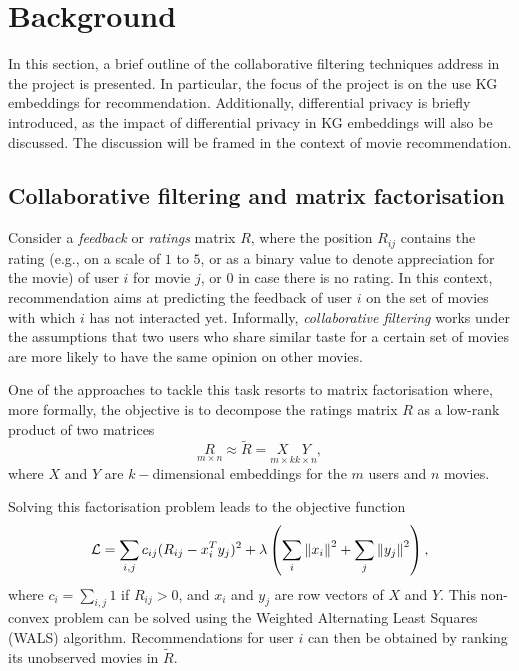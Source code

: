 \section{Background}\label{sec:background}

In this section, a brief outline of the collaborative filtering techniques address in the project is presented.
In particular, the focus of the project is on the use KG embeddings for recommendation.
Additionally, differential privacy \parencite{dwork2008differential} is briefly introduced, as the impact of differential privacy in KG embeddings will also be discussed.
The discussion will be framed in the context of movie recommendation.

\subsection{Collaborative filtering and matrix factorisation}\label{sec:factorisation}

Consider a \emph{feedback} or \emph{ratings} matrix $R$, where the position $R_{ij}$ contains the rating (e.g., on a scale of $1$ to $5$, or as a binary value to denote appreciation for the movie) of user $i$ for movie $j$, or $0$ in case there is no rating.
In this context, recommendation aims at predicting the feedback of user $i$ on the set of movies with which $i$ has not interacted yet. 
Informally, \emph{collaborative filtering} works under the assumptions that two users who share similar taste for a certain set of movies are more likely to have the same opinion on other movies.

One of the approaches to tackle this task resorts to matrix factorisation where, more formally, the objective is to decompose the ratings matrix $R$ as a low-rank product of two matrices
$$ \underset{\scriptscriptstyle{m \times n}}{R} \approx \widetilde{R} = \underset{\scriptscriptstyle{m\times k}}{X}\underset{\scriptscriptstyle{k\times n}}{Y},$$
where $X$ and $Y$ are $k-$dimensional embeddings for the $m$ users and $n$ movies.

Solving this factorisation problem leads to the objective function
\begin{equation}\label{eq:wals}
  \mathcal{L} = \sum_{i, j} c_{ij} (R_{ij} - {x_i^T y_j})^2 + \lambda \left( \sum_i \left\lVert{x_i}\right\rVert^2 + \sum_j \left\lVert{y_j}\right\rVert^2 \right),
\end{equation}
where $c_i = \sum_{i, j}1$ if $R_{ij}>0$, and $x_i$ and $y_j$ are row vectors of $X$ and $Y$.
This non-convex problem can be solved using the Weighted Alternating Least Squares (WALS) algorithm.
Recommendations for user $i$ can then be obtained by ranking its unobserved movies in $\widetilde{R}$.

